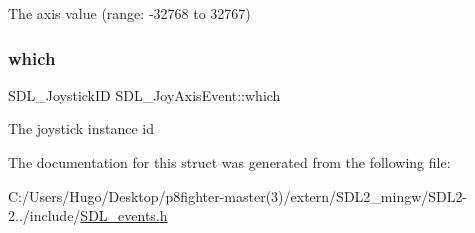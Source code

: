 The axis value (range\+: -\/32768 to 32767) \mbox{\label{struct_s_d_l___joy_axis_event_a965719f4703a7091bcc5f07f79fcf7e1}} 
\subsubsection{\texorpdfstring{which}{which}}
{\footnotesize\ttfamily S\+D\+L\+\_\+\+Joystick\+ID S\+D\+L\+\_\+\+Joy\+Axis\+Event\+::which}

The joystick instance id 

The documentation for this struct was generated from the following file\+:\begin{DoxyCompactItemize}
\item 
C\+:/\+Users/\+Hugo/\+Desktop/p8fighter-\/master(3)/extern/\+S\+D\+L2\+\_\+mingw/\+S\+D\+L2-\/2../include/\hyperlink{_s_d_l__events_8h}{S\+D\+L\+\_\+events.\+h}\end{DoxyCompactItemize}
